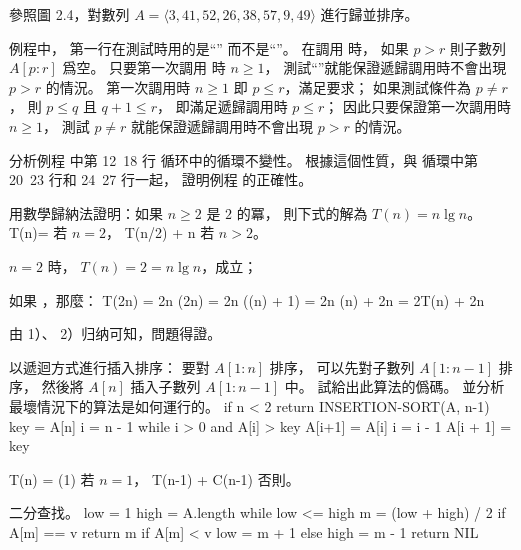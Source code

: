 \startsection[
  title={Designing algorithms},
]

\startEXERCISE
參照圖 2.4，對數列 $A=\langle 3,41,52,26,38,57,9,49\rangle$ 進行歸並排序。
\stopEXERCISE
\startANSWER
\externalfigure[output/e2_3_1-1]
\stopANSWER

\startEXERCISE
{} 例程中，
第一行在測試時用的是“” 而不是“”。
在調用  時，
如果 $p>r$ 則子數列 $A[p:r]$ 爲空。
只要第一次調用  時 $n\ge 1$，
測試“”就能保證遞歸調用時不會出現 $p>r$ 的情況。
\stopEXERCISE
\startANSWER
第一次調用時 $n\ge 1$ 即 $p\le r$，滿足要求；
如果測試條件為 $p\ne r$，
則 $p\le q$ 且 $q+1\le r$，
即滿足遞歸調用時 $p\le r$；
因此只要保證第一次調用時 $n\ge 1$，
測試 $p\ne r$ 就能保證遞歸調用時不會出現 $p>r$ 的情況。
\stopANSWER

\startEXERCISE
分析例程  中第 12~18 行  循环中的循環不變性。
根據這個性質，與  循環中第 20~23 行和 24~27 行一起，
證明例程  的正確性。
\stopEXERCISE
\startANSWER
{}
\stopANSWER

\startEXERCISE
用數學歸納法證明：如果 $n\ge 2$ 是 $2$ 的冪，
則下式的解為 $T(n)=n\lg n$。
\startformula
T(n)=\startmathcases
{} \NC 若 $n=2$，\NR
{} T(n/2) + n \NC 若 $n>2$。 \NR
\stopmathcases
\stopformula
\stopEXERCISE

\startANSWER
\startigBase[n]
\item $n=2$ 時， $T(n)=2=n\lg n$，成立；
\item 如果 ，那麼：
\startformula\startalign
\NC T(2n) \NC = 2n \lg(2n) \NR
\NC       \NC = 2n (\lg(n) + 1) \NR
\NC	      \NC = 2n \lg(n) + 2n \NR
\NC	      \NC = 2T(n) + 2n \NR
\stopalign\stopformula
\item 由 1）、 2）归纳可知，問題得證。
\stopigBase
\stopANSWER

\startEXERCISE
以遞迴方式進行插入排序：
要對 $A[1:n]$ 排序，
可以先對子數列 $A[1:n-1]$ 排序，
然後將 $A[n]$ 插入子數列 $A[1:n-1]$ 中。
試給出此算法的僞碼。
並分析最壞情況下的算法是如何運行的。
\stopEXERCISE
\startANSWER
{}
\startCLRS
if n < 2
	return
INSERTION-SORT(A, n-1)
key = A[n]
i = n - 1
while i > 0 and A[i] > key
	A[i+1] = A[i]
	i = i - 1
A[i + 1] = key
\stopCLRS

\startformula
T(n) = \startmathcases
\NC \Theta(1)		\NC 若 $n = 1$， \NR
\NC T(n-1) + C(n-1)	\NC 否則。 \NR
\stopmathcases
\stopformula
\stopANSWER

二分查找。
\stopEXERCISE
\startANSWER
{}
\startCLRS
low = 1
high = A.length
while low <= high
	m = (low + high) / 2
	if A[m] == v
		return m
	if A[m] < v
		low = m + 1
	else
		high = m - 1
return NIL
\stopCLRS


